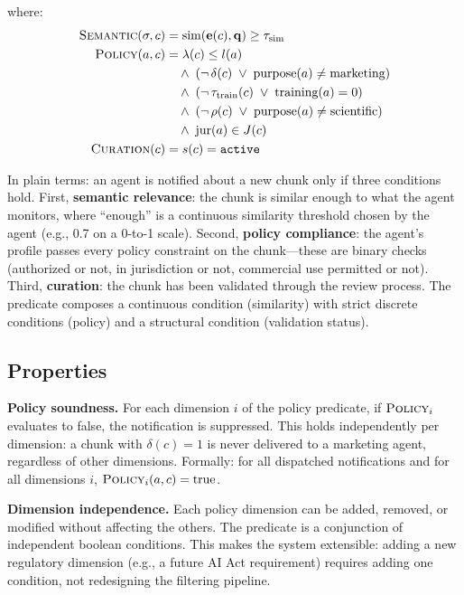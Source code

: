 \documentclass[11pt]{article}
\begin{document}
\noindent where:
\begin{align}
\textsc{Semantic}(\sigma, c) &= \text{sim}(\mathbf{e}(c), \mathbf{q}) \geq \tau_{\text{sim}} \\
\textsc{Policy}(a, c) &= \lambda(c) \leq l(a) \nonumber \\
  &\quad \wedge\; (\neg\,\delta(c) \;\vee\; \text{purpose}(a) \neq \text{marketing}) \nonumber \\
  &\quad \wedge\; (\neg\,\tau_{\text{train}}(c) \;\vee\; \text{training}(a) = 0) \nonumber \\
  &\quad \wedge\; (\neg\,\rho(c) \;\vee\; \text{purpose}(a) \neq \text{scientific}) \nonumber \\
  &\quad \wedge\; \text{jur}(a) \in J(c) \\
\textsc{Curation}(c) &= s(c) = \texttt{active}
\end{align}

In plain terms: an agent is notified about a new chunk only if three conditions hold. First, \textbf{semantic relevance}: the chunk is similar enough to what the agent monitors, where ``enough'' is a continuous similarity threshold chosen by the agent (e.g., 0.7 on a 0-to-1 scale). Second, \textbf{policy compliance}: the agent's profile passes every policy constraint on the chunk---these are binary checks (authorized or not, in jurisdiction or not, commercial use permitted or not). Third, \textbf{curation}: the chunk has been validated through the review process. The predicate composes a continuous condition (similarity) with strict discrete conditions (policy) and a structural condition (validation status).

\subsection{Properties}

\textbf{Policy soundness.} For each dimension $i$ of the policy predicate, if $\textsc{Policy}_i$ evaluates to false, the notification is suppressed. This holds independently per dimension: a chunk with $\delta(c) = 1$ is never delivered to a marketing agent, regardless of other dimensions. Formally: for all dispatched notifications and for all dimensions $i$, $\textsc{Policy}_i(a, c) = \text{true}$.

\textbf{Dimension independence.} Each policy dimension can be added, removed, or modified without affecting the others. The predicate is a conjunction of independent boolean conditions. This makes the system extensible: adding a new regulatory dimension (e.g., a future AI Act requirement) requires adding one condition, not redesigning the filtering pipeline.
\end{document}
